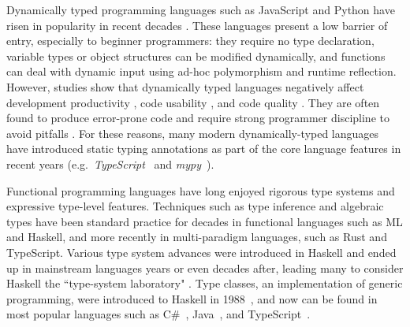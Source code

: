 


Dynamically typed programming languages such as JavaScript and Python have risen in popularity in recent decades \cite{Chatley2019-uq}. These languages present a low barrier of entry, especially to beginner programmers: they require no type declaration, variable types or object structures can be modified dynamically, and functions can deal with dynamic input using ad-hoc polymorphism and runtime reflection. However, studies show that dynamically typed languages negatively affect development productivity \cite{Kleinschmager2012-bg}, code usability \cite{Mayer2012-lg}, and code quality \cite{Gao2017-xn, Ray2017-gq, Meyerovich2013-pn}. They are often found to produce error-prone code \cite{Chen2020-nq, Wang2015-rs, Xu2016-za} and require strong programmer discipline to avoid pitfalls \cite{Chen2020-nq}. For these reasons, many modern dynamically-typed languages have introduced static typing annotations as part of the core language features in recent years (e.g.\ \textit{TypeScript}~\cite{Microsoft_undated-ts} and \textit{mypy}~\cite{Mypy_undated-oe}).

Functional programming languages have long enjoyed rigorous type systems and expressive type-level features. Techniques such as type inference and algebraic types have been standard practice for decades in functional languages such as ML and Haskell, and more recently in multi-paradigm languages, such as Rust and TypeScript. Various type system advances were introduced in Haskell and ended up in mainstream languages years or even decades after, leading many to consider Haskell the ``type-system laboratory" \cite{Hudak2007-kn}.  Type classes, an implementation of generic programming, were introduced to Haskell in 1988~\cite{Hudak2007-kn}, and now can be found in most popular languages such as C\#~\cite{Bill_Wagner2022-sq}, Java~\cite{Oracle2022-lc}, and TypeScript~\cite{Microsoft2022-tl}.

